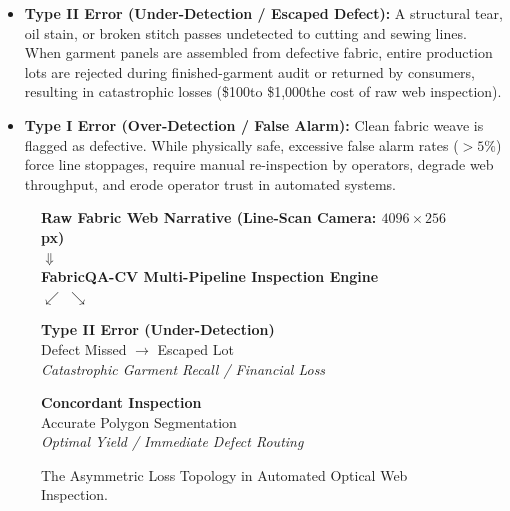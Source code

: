 \documentclass[10pt,a4paper]{article}
\begin{document}
\begin{itemize}[leftmargin=1.5em,itemsep=3pt]
    \item \textbf{Type II Error (Under-Detection / Escaped Defect):} A structural tear, oil stain, or broken stitch passes undetected to cutting and sewing lines. When garment panels are assembled from defective fabric, entire production lots are rejected during finished-garment audit or returned by consumers, resulting in catastrophic losses (\$100\times to \$1,000\times the cost of raw web inspection).
    \item \textbf{Type I Error (Over-Detection / False Alarm):} Clean fabric weave is flagged as defective. While physically safe, excessive false alarm rates ($> 5\%$) force line stoppages, require manual re-inspection by operators, degrade web throughput, and erode operator trust in automated systems.
\end{itemize}

\begin{figure}[htbp]
\centering
\begin{tcolorbox}[colback=white,colframe=primaryblue,arc=2mm,boxrule=1pt,width=0.92\textwidth]
\centering
\small
\textbf{Raw Fabric Web Narrative (Line-Scan Camera: $4096 \times 256$ px)}\\[0.3em]
$\Downarrow$\\[0.3em]
\textbf{FabricQA-CV Multi-Pipeline Inspection Engine}\\[0.3em]
$\swarrow$ \hspace{6cm} $\searrow$\\[0.3em]
\begin{minipage}{0.45\textwidth}
\centering
\textcolor{alertred}{\textbf{Type II Error (Under-Detection)}}\\
Defect Missed $\rightarrow$ Escaped Lot\\
\textit{Catastrophic Garment Recall / Financial Loss}
\end{minipage}
\hfill
\begin{minipage}{0.45\textwidth}
\centering
\textcolor{accentblue}{\textbf{Concordant Inspection}}\\
Accurate Polygon Segmentation\\
\textit{Optimal Yield / Immediate Defect Routing}
\end{minipage}
\end{tcolorbox}
\caption{The Asymmetric Loss Topology in Automated Optical Web Inspection.}
\label{fig:loss_topology}
\end{figure}
\end{document}
